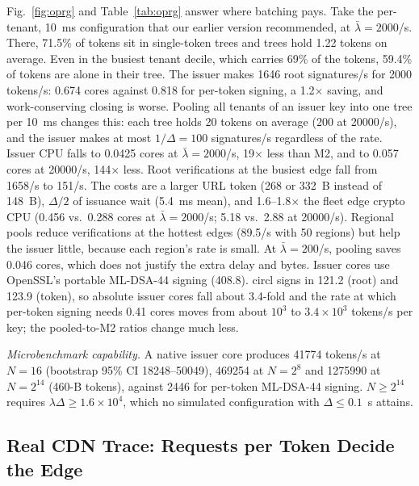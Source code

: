 Fig.~\ref{fig:oprg} and Table~\ref{tab:oprg} answer where batching pays. Take the per-tenant, 10~ms configuration that our earlier version recommended, at $\bar\lambda=2000$/s. There, 71.5\% of tokens sit in single-token trees and trees hold 1.22 tokens on average. Even in the busiest tenant decile, which carries 69\% of the tokens, 59.4\% of tokens are alone in their tree. The issuer makes \num{1646} root signatures/s for \num{2000} tokens/s: 0.674 cores against 0.818 for per-token signing, a 1.2$\times$ saving, and work-conserving closing is worse. Pooling all tenants of an issuer key into one tree per 10~ms changes this: each tree holds 20 tokens on average (200 at \num{20000}/s), and the issuer makes at most $1/\Delta=100$ signatures/s regardless of the rate. Issuer CPU falls to 0.0425 cores at $\bar\lambda=2000$/s, 19$\times$ less than M2, and to 0.057 cores at \num{20000}/s, 144$\times$ less. Root verifications at the busiest edge fall from \num{1658}/s to 151/s. The costs are a larger URL token (268 or 332~B instead of 148~B), $\Delta/2$ of issuance wait (5.4~ms mean), and 1.6--1.8$\times$ the fleet edge crypto CPU (0.456 vs.\ 0.288 cores at $\bar\lambda=2000$/s; 5.18 vs.\ 2.88 at \num{20000}/s). Regional pools reduce verifications at the hottest edges (89.5/s with 50 regions) but help the issuer little, because each region's rate is small. At $\bar\lambda=200$/s, pooling saves 0.046 cores, which does not justify the extra delay and bytes. Issuer cores use OpenSSL's portable ML-DSA-44 signing (408.8\us). circl signs in 121.2\us{} (root) and 123.9\us{} (token), so absolute issuer cores fall about 3.4-fold and the rate at which per-token signing needs 0.41 cores moves from about $10^3$ to $3.4\times10^3$ tokens/s per key; the pooled-to-M2 ratios change much less.

\emph{Microbenchmark capability.} A native issuer core produces \num{41774} tokens/s at $N=16$ (bootstrap 95\% CI \num{18248}--\num{50049}), \num{469254} at $N=2^8$ and \num{1275990} at $N=2^{14}$ (460-B tokens), against \num{2446} for per-token ML-DSA-44 signing. $N\ge2^{14}$ requires $\lambda\Delta\ge1.6\times10^4$, which no simulated configuration with $\Delta\le0.1$~s attains.

\subsection{Real CDN Trace: Requests per Token Decide the Edge}
\label{sec:res-trace}

